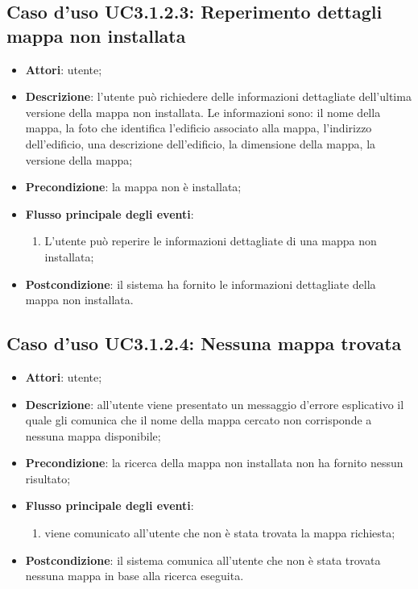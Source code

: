 \documentclass[../AnalisiDeiRequisiti.tex]{subfiles}
\begin{document}
\subsection{Caso d'uso UC3.1.2.3: Reperimento dettagli mappa non installata}
\begin{itemize}
\item \textbf{Attori}: utente;
\item \textbf{Descrizione}: l'utente può richiedere delle informazioni dettagliate dell'ultima versione della mappa non installata. Le informazioni sono: il nome della mappa, la foto che identifica l'edificio associato alla mappa, l'indirizzo dell'edificio, una descrizione dell'edificio, la dimensione della mappa, la versione della mappa; 
      \item \textbf{Precondizione}: la mappa non è installata;

        \item \textbf{Flusso principale degli eventi}:
          \begin{enumerate}
          \item L'utente può reperire le informazioni dettagliate di una mappa non installata;

      \end{enumerate}
    \item \textbf{Postcondizione}: il sistema ha fornito le informazioni dettagliate della mappa non installata.
  \end{itemize}
\hypertarget{UC3.1.2.4}{}
\subsection{Caso d'uso UC3.1.2.4: Nessuna mappa trovata}
\begin{itemize}
\item \textbf{Attori}: utente;
\item \textbf{Descrizione}: all'utente viene presentato un messaggio d'errore esplicativo il quale gli comunica che il nome della mappa cercato non corrisponde a nessuna mappa disponibile; 
      \item \textbf{Precondizione}: la ricerca della mappa non installata non ha fornito nessun risultato;

        \item \textbf{Flusso principale degli eventi}:
          \begin{enumerate}
          \item viene comunicato all'utente che non è stata trovata la mappa richiesta;

      \end{enumerate}
    \item \textbf{Postcondizione}: il sistema comunica all'utente che non è stata trovata nessuna mappa in base alla ricerca eseguita.
  \end{itemize}
\hypertarget{UC3.2}{}
\end{document}
